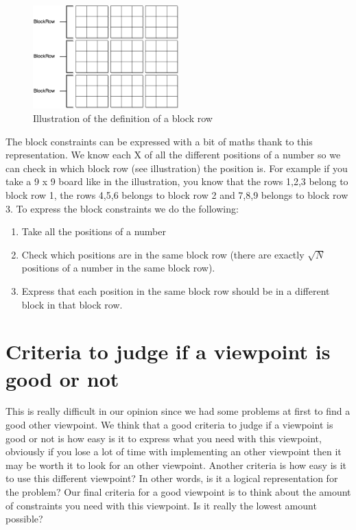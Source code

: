 \documentclass{report}
\begin{document}
\begin{figure}[h]
\centering
\includegraphics[width=0.5\textwidth]{blockRow}
\caption{Illustration of the definition of a block row}
\end{figure}

The block constraints can be expressed with a bit of maths thank to this representation. We know each X of all the different positions of a number so we can check in which block row (see illustration) the position is. For example if you take a 9 x 9 board like in the illustration, you know that the rows 1,2,3 belong to block row 1, the rows 4,5,6 belongs to block row 2 and 7,8,9 belongs to block row 3. To express the block constraints we do the following:
\begin{enumerate}
	\item Take all the positions of a number
	\item Check which positions are in the same block row (there are exactly $\sqrt{N}$ positions of a number in the same block row).
	\item Express that each position in the same block row should be in a different block in that block row.
\end{enumerate}

\section{Criteria to judge if a viewpoint is good or not}
This is really difficult in our opinion since we had some problems at first to find a good other viewpoint. We think that a good criteria to judge if a viewpoint is good or not is how easy is it to express what you need with this viewpoint, obviously if you lose a lot of time with implementing an other viewpoint then it may be worth it to look for an other viewpoint. Another criteria is how easy is it to use this different viewpoint? In other words, is it a logical representation for the problem? Our final criteria for a good viewpoint is to think about the amount of constraints you need with this viewpoint. Is it really the lowest amount possible?
\end{document}
